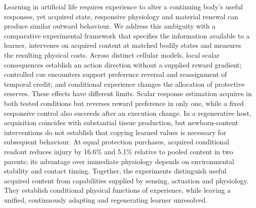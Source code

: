 Learning in artificial life requires experience to alter a continuing body's useful responses, yet acquired state, responsive physiology and material renewal can produce similar outward behaviour. We address this ambiguity with a comparative experimental framework that specifies the information available to a learner, intervenes on acquired content at matched bodily states and measures the resulting physical costs. Across distinct cellular models, local scalar consequences establish an action direction without a supplied reward gradient; controlled cue encounters support preference reversal and reassignment of temporal credit; and conditional experience changes the allocation of protective reserves. These effects have different limits. Scalar response estimation acquires in both tested conditions but reverses reward preference in only one, while a fixed responsive control also succeeds after an execution change. In a regenerative host, acquisition coincides with substantial tissue production, but newborn-content interventions do not establish that copying learned values is necessary for subsequent behaviour. At equal protection purchases, acquired conditional readout reduces injury by 16.6\% and 5.1\% relative to pooled content in two parents; its advantage over immediate physiology depends on environmental stability and contact timing. Together, the experiments distinguish useful acquired content from capabilities supplied by sensing, actuation and physiology. They establish conditional physical functions of experience, while leaving a unified, continuously adapting and regenerating learner unresolved.
